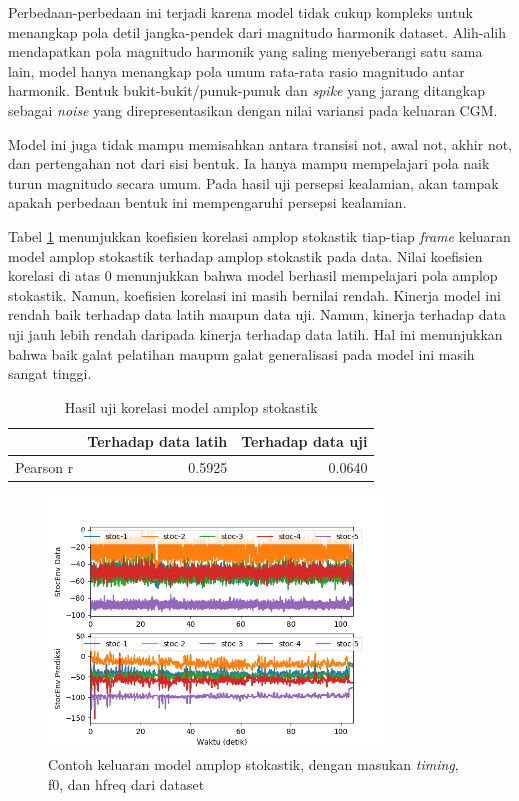 Perbedaan-perbedaan ini terjadi karena model tidak cukup kompleks untuk menangkap pola detil jangka-pendek dari magnitudo harmonik dataset. Alih-alih mendapatkan pola magnitudo harmonik yang saling menyeberangi satu sama lain, model hanya menangkap pola umum rata-rata rasio magnitudo antar harmonik. Bentuk bukit-bukit/punuk-punuk dan \textit{spike} yang jarang ditangkap sebagai \textit{noise} yang direpresentasikan dengan nilai variansi pada keluaran CGM.

Model ini juga tidak mampu memisahkan antara transisi not, awal not, akhir not, dan pertengahan not dari sisi bentuk. Ia hanya mampu mempelajari pola naik turun magnitudo secara umum. Pada hasil uji persepsi kealamian, akan tampak apakah perbedaan bentuk ini mempengaruhi persepsi kealamian.

Tabel \ref{tab-stoc-testing-results} menunjukkan koefisien korelasi amplop stokastik tiap-tiap \textit{frame} keluaran model amplop stokastik terhadap amplop stokastik pada data. Nilai koefisien korelasi di atas 0 menunjukkan bahwa model berhasil mempelajari pola amplop stokastik. Namun, koefisien korelasi ini masih bernilai rendah. Kinerja model ini rendah baik terhadap data latih maupun data uji. Namun, kinerja terhadap data uji jauh lebih rendah daripada kinerja terhadap data latih. Hal ini menunjukkan bahwa baik galat pelatihan maupun galat generalisasi pada model ini masih sangat tinggi.

\begin{table}[htbp]
    \centering
    \caption{Hasil uji korelasi model amplop stokastik}\label{tab-stoc-testing-results}
    \begin{tabular}{ |l|r|r| } 
     \cline{2-3}
     \multicolumn{1}{l|}{}&Terhadap data latih&Terhadap data uji\\\hline
	 Pearson r&0.5925  &0.0640\\\hline
    \end{tabular}
\end{table}

\begin{figure}[htbp]
    \centering
    \includegraphics[width=0.8\textwidth]{resources/Analisis_StocEnv.png}
    \caption{Contoh keluaran model amplop stokastik, dengan masukan \textit{timing}, f0, dan hfreq dari dataset}\label{fig-stocenv-output-sample}
\end{figure}

